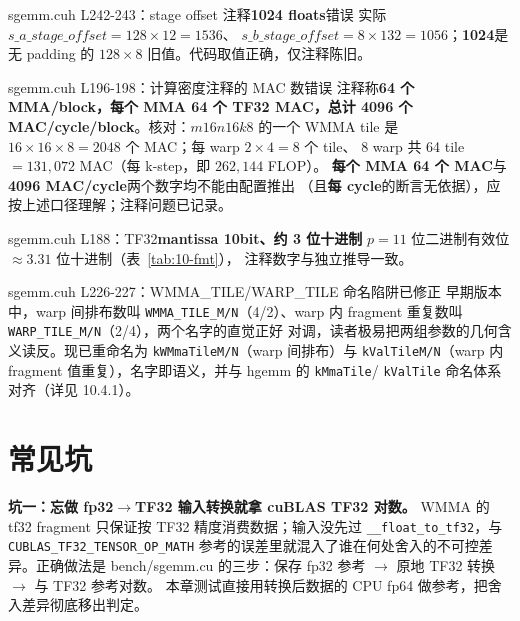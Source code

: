 \begin{kaogu}[F3]{sgemm.cuh L242-243：stage offset 注释\textbf{1024 floats}错误}
  实际 $s\_a\_stage\_offset = 128\times12 = 1536$、
  $s\_b\_stage\_offset = 8\times132 = 1056$；\textbf{1024}是无 padding 的
  $128\times8$ 旧值。代码取值正确，仅注释陈旧。
\end{kaogu}

\begin{kaogu}[F4]{sgemm.cuh L196-198：计算密度注释的 MAC 数错误}
  注释称\textbf{64 个 MMA/block，每个 MMA 64 个 TF32 MAC，总计 4096 个
  MAC/cycle/block}。核对：$m16n16k8$ 的一个 WMMA tile 是
  $16\times16\times8 = 2048$ 个 MAC；每 warp $2\times4=8$ 个 tile、
  8 warp 共 64 tile $= 131{,}072$ MAC（每 k-step，即 $262{,}144$ FLOP）。
  \textbf{每个 MMA 64 个 MAC}与\textbf{4096 MAC/cycle}两个数字均不能由配置推出
  （且\textbf{每 cycle}的断言无依据），应按上述口径理解；注释问题已记录。
\end{kaogu}

\begin{kaogu}[F3 核校通过]{sgemm.cuh L188：TF32\textbf{mantissa 10bit、约 3 位十进制}}
  $p=11$ 位二进制有效位 $\approx 3.31$ 位十进制（表~\ref{tab:10-fmt}），
  注释数字与独立推导一致。
\end{kaogu}

\begin{kaogu}[F3 历史注记]{sgemm.cuh L226-227：WMMA\_TILE/WARP\_TILE 命名陷阱已修正}
  早期版本中，warp 间排布数叫 \texttt{WMMA\_TILE\_M/N}（4/2）、warp 内
  fragment 重复数叫 \texttt{WARP\_TILE\_M/N}（2/4），两个名字的直觉正好
  对调，读者极易把两组参数的几何含义读反。现已重命名为
  \texttt{kWMmaTileM/N}（warp 间排布）与 \texttt{kValTileM/N}（warp 内
  fragment 值重复），名字即语义，并与 hgemm 的 \texttt{kMmaTile}/
  \texttt{kValTile} 命名体系对齐（详见 10.4.1）。
\end{kaogu}

\section{常见坑}

\textbf{坑一：忘做 fp32$\to$TF32 输入转换就拿 cuBLAS TF32 对数。}
WMMA 的 tf32 fragment 只保证按 TF32 精度消费数据；输入没先过
\texttt{\_\allowbreak{}\_\allowbreak{}float\_\allowbreak{}to\_\allowbreak{}tf32}，与 \texttt{CUBLAS\_\allowbreak{}TF32\_\allowbreak{}TENSOR\_\allowbreak{}OP\_\allowbreak{}MATH}
参考的误差里就混入了谁在何处舍入的不可控差异。正确做法是
bench/sgemm.cu 的三步：保存 fp32 参考 $\to$ 原地 TF32 转换 $\to$ 与 TF32 参考对数。
本章测试直接用转换后数据的 CPU fp64 做参考，把舍入差异彻底移出判定。

